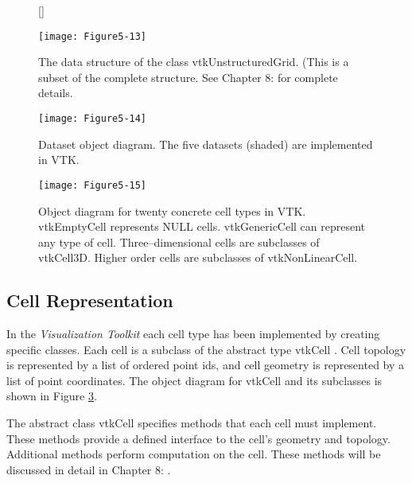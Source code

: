 \begin{figure}[!htb]
	[\FBwidth]
	{\caption{The data structure of the class vtkUnstructuredGrid. (This is a subset of the complete structure. See Chapter 8:  for complete details.}\label{fig:Figure5-13}}
	{\texttt{[image: Figure5-13]}}
\end{figure}



\begin{figure}[!htb]
	\centering
	\texttt{[image: Figure5-14]}
	\caption{Dataset object diagram. The five datasets (shaded) are implemented in VTK.}
	\label{fig:Figure5-14}
\end{figure}

\begin{figure}[!htb]
	\centering
	\texttt{[image: Figure5-15]}
	\caption{Object diagram for twenty concrete cell types in VTK. vtkEmptyCell represents NULL cells. vtkGenericCell can represent any type of cell. Three--dimensional cells are subclasses of vtkCell3D. Higher order cells are subclasses of vtkNonLinearCell.}
	\label{fig:Figure5-15}
\end{figure}


\subsection{Cell Representation}

In the \emph{Visualization Toolkit} each cell type has been implemented by creating specific classes. Each cell is a subclass of the abstract type vtkCell . Cell topology is represented by a list of ordered point ids, and cell geometry is represented by a list of point coordinates. The object diagram for vtkCell and its subclasses is shown in Figure \ref{fig:Figure5-15}.

The abstract class vtkCell specifies methods that each cell must implement. These methods provide a defined interface to the cell's geometry and topology. Additional methods perform computation on the cell. These methods will be discussed in detail in Chapter 8: .

